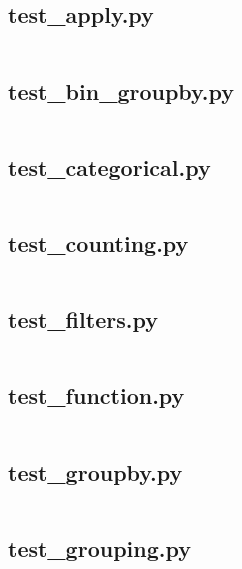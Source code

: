 \documentclass{article}
\begin{document}
\subsection{test\_apply.py}
\inputminted{python}{/home/dufferzafar/dev/@clones/pandas/pandas/tests/groupby/test_apply.py}
\newpage

\subsection{test\_bin\_groupby.py}
\inputminted{python}{/home/dufferzafar/dev/@clones/pandas/pandas/tests/groupby/test_bin_groupby.py}
\newpage

\subsection{test\_categorical.py}
\inputminted{python}{/home/dufferzafar/dev/@clones/pandas/pandas/tests/groupby/test_categorical.py}
\newpage

\subsection{test\_counting.py}
\inputminted{python}{/home/dufferzafar/dev/@clones/pandas/pandas/tests/groupby/test_counting.py}
\newpage

\subsection{test\_filters.py}
\inputminted{python}{/home/dufferzafar/dev/@clones/pandas/pandas/tests/groupby/test_filters.py}
\newpage

\subsection{test\_function.py}
\inputminted{python}{/home/dufferzafar/dev/@clones/pandas/pandas/tests/groupby/test_function.py}
\newpage

\subsection{test\_groupby.py}
\inputminted{python}{/home/dufferzafar/dev/@clones/pandas/pandas/tests/groupby/test_groupby.py}
\newpage

\subsection{test\_grouping.py}
\inputminted{python}{/home/dufferzafar/dev/@clones/pandas/pandas/tests/groupby/test_grouping.py}
\newpage
\end{document}
